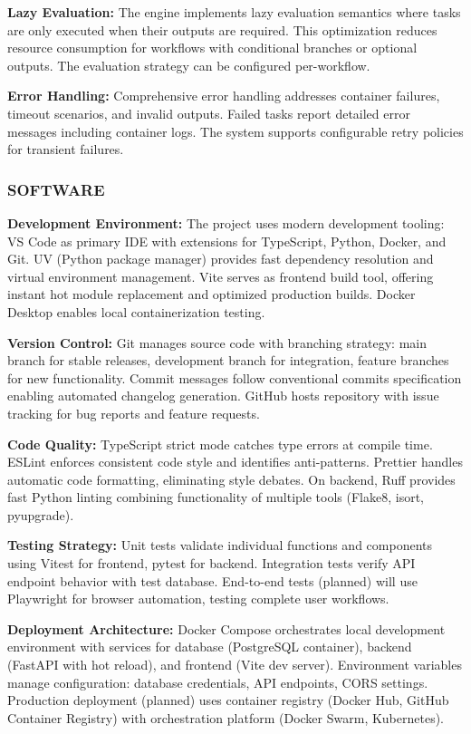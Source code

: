 \documentclass[12pt]{article}
\begin{document}
\textbf{Lazy Evaluation:} The engine implements lazy evaluation semantics where tasks are only executed when their outputs are required. This optimization reduces resource consumption for workflows with conditional branches or optional outputs. The evaluation strategy can be configured per-workflow.

\textbf{Error Handling:} Comprehensive error handling addresses container failures, timeout scenarios, and invalid outputs. Failed tasks report detailed error messages including container logs. The system supports configurable retry policies for transient failures.

\subsubsection{SOFTWARE}

\textbf{Development Environment:} The project uses modern development tooling: VS Code as primary IDE with extensions for TypeScript, Python, Docker, and Git. UV (Python package manager) provides fast dependency resolution and virtual environment management. Vite serves as frontend build tool, offering instant hot module replacement and optimized production builds. Docker Desktop enables local containerization testing.

\textbf{Version Control:} Git manages source code with branching strategy: main branch for stable releases, development branch for integration, feature branches for new functionality. Commit messages follow conventional commits specification enabling automated changelog generation. GitHub hosts repository with issue tracking for bug reports and feature requests.

\textbf{Code Quality:} TypeScript strict mode catches type errors at compile time. ESLint enforces consistent code style and identifies anti-patterns. Prettier handles automatic code formatting, eliminating style debates. On backend, Ruff provides fast Python linting combining functionality of multiple tools (Flake8, isort, pyupgrade).

\textbf{Testing Strategy:} Unit tests validate individual functions and components using Vitest for frontend, pytest for backend. Integration tests verify API endpoint behavior with test database. End-to-end tests (planned) will use Playwright for browser automation, testing complete user workflows.

\textbf{Deployment Architecture:} Docker Compose orchestrates local development environment with services for database (PostgreSQL container), backend (FastAPI with hot reload), and frontend (Vite dev server). Environment variables manage configuration: database credentials, API endpoints, CORS settings. Production deployment (planned) uses container registry (Docker Hub, GitHub Container Registry) with orchestration platform (Docker Swarm, Kubernetes).
\end{document}
